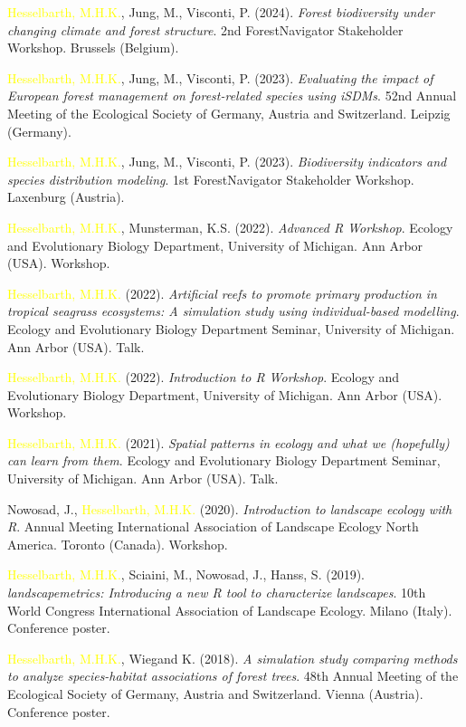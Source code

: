 \documentclass[hidelinks]{report}
\begin{document}
\begin{hangparas}{7.5mm}{1}

\textcolor{yellow}{Hesselbarth, M.H.K.}, Jung, M., Visconti, P. (2024). \textit{Forest biodiversity under changing climate and forest structure}. 2nd ForestNavigator Stakeholder Workshop. Brussels (Belgium).
	
\textcolor{yellow}{Hesselbarth, M.H.K.}, Jung, M., Visconti, P. (2023). \textit{Evaluating the impact of European forest management on forest-related species using iSDMs}. 52nd Annual Meeting of the Ecological Society of Germany, Austria and Switzerland. Leipzig (Germany).
	
\textcolor{yellow}{Hesselbarth, M.H.K.}, Jung, M., Visconti, P. (2023). \textit{Biodiversity indicators and species distribution modeling}. 1st ForestNavigator Stakeholder Workshop. Laxenburg (Austria).

\textcolor{yellow}{Hesselbarth, M.H.K.}, Munsterman, K.S. (2022). \textit{Advanced R Workshop}. Ecology and Evolutionary Biology Department, University of Michigan. Ann Arbor (USA). Workshop.

\textcolor{yellow}{Hesselbarth, M.H.K.} (2022). \textit{Artificial reefs to promote primary production in tropical seagrass ecosystems: A simulation study using individual-based modelling}. Ecology and Evolutionary Biology Department Seminar, University of Michigan. Ann Arbor (USA). Talk.

\textcolor{yellow}{Hesselbarth, M.H.K.} (2022). \textit{Introduction to R Workshop}. Ecology and Evolutionary Biology Department, University of Michigan. Ann Arbor (USA). Workshop.

\textcolor{yellow}{Hesselbarth, M.H.K.} (2021). \textit{Spatial patterns in ecology and what we (hopefully) can learn from them}. Ecology and Evolutionary Biology Department Seminar, University of Michigan. Ann Arbor (USA). Talk.

Nowosad, J., \textcolor{yellow}{Hesselbarth, M.H.K.} (2020). \textit{Introduction to landscape ecology with R}. Annual Meeting International Association of Landscape Ecology North America. Toronto (Canada). Workshop.

\textcolor{yellow}{Hesselbarth, M.H.K.}, Sciaini, M., Nowosad, J., Hanss, S. (2019). \textit{landscapemetrics: Introducing a new R tool to characterize landscapes}. 10th World Congress International Association of Landscape Ecology. Milano (Italy). Conference poster.

\textcolor{yellow}{Hesselbarth, M.H.K.}, Wiegand K. (2018). \textit{A simulation study comparing methods to analyze species-habitat associations of forest trees}. 48th Annual Meeting of the Ecological Society of Germany, Austria and Switzerland. Vienna (Austria). Conference poster.

\end{hangparas}
\end{document}
